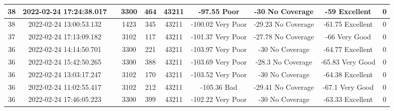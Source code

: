 \begin{longtable*}{|c|c|c|c|c|c|c|c|c|c|}
38&2022-02-24 17:24:38.017&&3300&464&43211& -97.55    Poor        & -30       No Coverage & -59       Excellent   & 0\\\hline
{}38&2022-02-24 13:00:53.132&&1423&345&43211& -100.02   Very Poor   & -29.23    No Coverage & -61.75    Excellent   & 0\\\hline
{}37&2022-02-24 17:13:09.182&&3102&117&43211& -101.37   Very Poor   & -27.78    No Coverage & -66       Very Good   & 0\\\hline
{}36&2022-02-24 14:14:50.701&&3300&221&43211& -103.97   Very Poor   & -30       No Coverage & -64.77    Excellent   & 0\\\hline
{}36&2022-02-24 15:42:50.265&&3300&388&43211& -103.69   Very Poor   & -28.3     No Coverage & -65.83    Very Good   & 0\\\hline
{}36&2022-02-24 13:03:17.247&&3102&170&43211& -103.52   Very Poor   & -30       No Coverage & -64.38    Excellent   & 0\\\hline
{}36&2022-02-24 11:02:55.417&&3102&212&43211& -105.36   Bad         & -29.41    No Coverage & -67.1     Very Good   & 0\\\hline
{}36&2022-02-24 17:46:05.223&&3300&399&43211& -102.22   Very Poor   & -30       No Coverage & -63.33    Excellent   & 0\\\hline

\end{longtable*}
